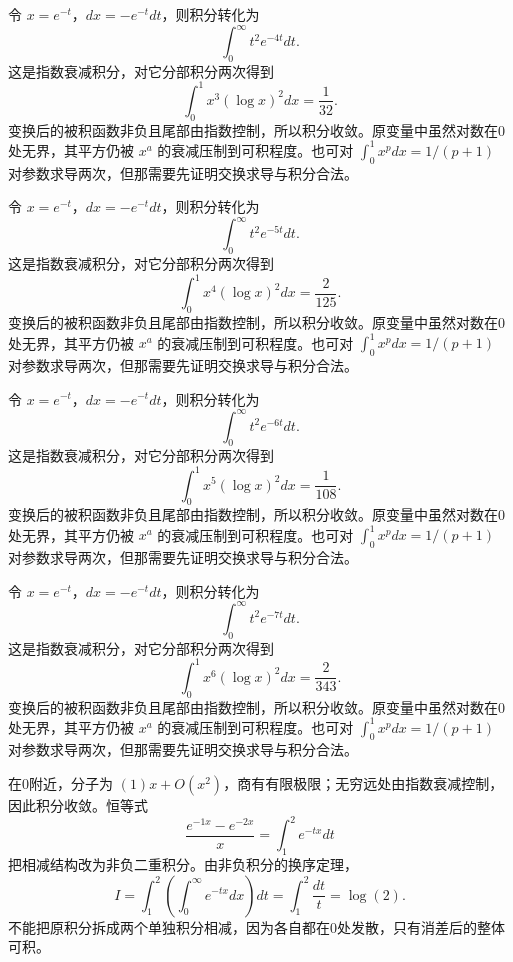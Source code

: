 \documentclass[UTF8,12pt,a4paper,fontset=fandol]{ctexart}
\begin{document}
\begin{solve}\label{ans:c20q9}
令 $x=e^{-t}$，$dx=-e^{-t}dt$，则积分转化为
\[
\int_0^\infty t^2e^{-4t}dt.
\]
这是指数衰减积分，对它分部积分两次得到
\[
\int_0^1x^{3}(\log x)^2dx=\frac{1}{32}.
\]
变换后的被积函数非负且尾部由指数控制，所以积分收敛。原变量中虽然对数在0处无界，其平方仍被 $x^a$ 的衰减压制到可积程度。也可对 $\int_0^1x^pdx=1/(p+1)$ 对参数求导两次，但那需要先证明交换求导与积分合法。
\end{solve}

\begin{solve}\label{ans:c20q10}
令 $x=e^{-t}$，$dx=-e^{-t}dt$，则积分转化为
\[
\int_0^\infty t^2e^{-5t}dt.
\]
这是指数衰减积分，对它分部积分两次得到
\[
\int_0^1x^{4}(\log x)^2dx=\frac{2}{125}.
\]
变换后的被积函数非负且尾部由指数控制，所以积分收敛。原变量中虽然对数在0处无界，其平方仍被 $x^a$ 的衰减压制到可积程度。也可对 $\int_0^1x^pdx=1/(p+1)$ 对参数求导两次，但那需要先证明交换求导与积分合法。
\end{solve}

\begin{solve}\label{ans:c20q11}
令 $x=e^{-t}$，$dx=-e^{-t}dt$，则积分转化为
\[
\int_0^\infty t^2e^{-6t}dt.
\]
这是指数衰减积分，对它分部积分两次得到
\[
\int_0^1x^{5}(\log x)^2dx=\frac{1}{108}.
\]
变换后的被积函数非负且尾部由指数控制，所以积分收敛。原变量中虽然对数在0处无界，其平方仍被 $x^a$ 的衰减压制到可积程度。也可对 $\int_0^1x^pdx=1/(p+1)$ 对参数求导两次，但那需要先证明交换求导与积分合法。
\end{solve}

\begin{solve}\label{ans:c20q12}
令 $x=e^{-t}$，$dx=-e^{-t}dt$，则积分转化为
\[
\int_0^\infty t^2e^{-7t}dt.
\]
这是指数衰减积分，对它分部积分两次得到
\[
\int_0^1x^{6}(\log x)^2dx=\frac{2}{343}.
\]
变换后的被积函数非负且尾部由指数控制，所以积分收敛。原变量中虽然对数在0处无界，其平方仍被 $x^a$ 的衰减压制到可积程度。也可对 $\int_0^1x^pdx=1/(p+1)$ 对参数求导两次，但那需要先证明交换求导与积分合法。
\end{solve}

\begin{solve}\label{ans:c20q13}
在0附近，分子为 $(1)x+O(x^2)$，商有有限极限；无穷远处由指数衰减控制，因此积分收敛。恒等式
\[
\frac{e^{-1x}-e^{-2x}}x=\int_{1}^{2}e^{-tx}dt
\]
把相减结构改为非负二重积分。由非负积分的换序定理，
\[
I=\int_{1}^{2}\left(\int_0^\infty e^{-tx}dx\right)dt=\int_{1}^{2}\frac{dt}t=\log(2).
\]
不能把原积分拆成两个单独积分相减，因为各自都在0处发散，只有消差后的整体可积。
\end{solve}
\end{document}
